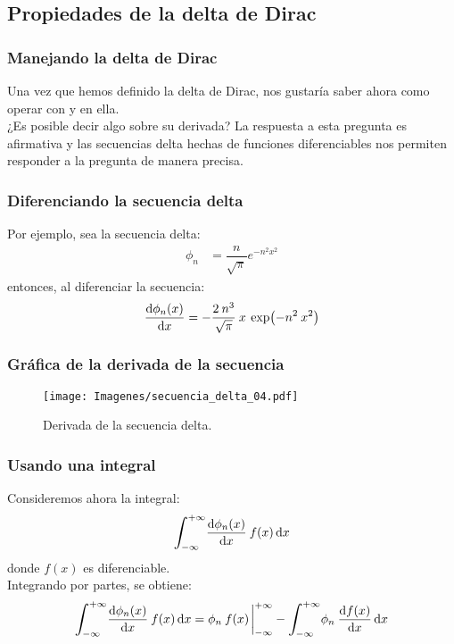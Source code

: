 \documentclass[12pt]{beamer}
\begin{document}
\subsection{Propiedades de la delta de Dirac}

\begin{frame}
\frametitle{Manejando la delta de Dirac}
Una vez que hemos definido la delta de Dirac, nos gustaría saber ahora como operar con y en ella. 
\\
\bigskip
\pause
¿Es posible decir algo sobre su derivada? \pause La respuesta a esta pregunta es afirmativa y las secuencias delta hechas de funciones diferenciables nos permiten responder a la pregunta de manera precisa.
\end{frame}

\begin{frame}
\frametitle{Diferenciando la secuencia delta}
Por ejemplo, sea la secuencia delta:
\pause
\begin{align*}
\phi_{n} &= \dfrac{n}{\sqrt{\pi}} e^{-n^{2} x^{2}}
\end{align*}
\pause
entonces, al diferenciar la secuencia:
\pause
\begin{align*}
\dv{\phi_{n}(x)}{x} = - \dfrac{2 \: n^{3}}{\sqrt{\pi}} \: x \: \exp(-n^{2} \: x^{2})
\end{align*}
\end{frame}

\begin{frame}
\frametitle{Gráfica de la derivada de la secuencia}
\begin{figure}[H]
    \centering
    \texttt{[image: Imagenes/secuencia\_delta\_04.pdf]}
    \caption{Derivada de la secuencia delta.}
    \label{fig:fig_figura_delta_04}
\end{figure}
\end{frame}

\begin{frame}
\frametitle{Usando una integral}
Consideremos ahora la integral:
\begin{align*}
\scaleint{6ex}_{\bs -\infty}^{+\infty} \dv{\phi_{n}(x)}{x} \: f (x) \dd{x}
\end{align*}
donde $f (x)$ es diferenciable.
\\
\bigskip
\pause
Integrando por partes, se obtiene:
\pause
\begin{align*}
\scaleint{6ex}_{\bs -\infty}^{+\infty} \dv{\phi_{n}(x)}{x} \: f (x) \dd{x} = \phi_{n} \: f (x) \eval_{-\infty}^{+\infty} - \scaleint{6ex}_{\bs -\infty}^{+\infty} \phi_{n} \: \dv{f (x)}{x} \dd{x}
\end{align*}
\end{frame}
\end{document}
